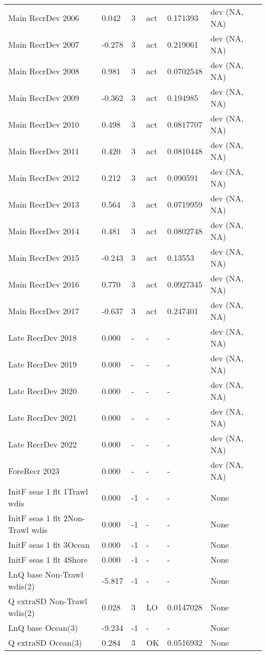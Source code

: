 \documentclass[11pt,
  english,
  letterpaper,
]{article}
\begin{document}
\begin{landscape}
\begin{longtable}[t]{>{\raggedright\arraybackslash}p{6cm}lllll>{\raggedright\arraybackslash}p{4cm}}
Main RecrDev 2006 & 0.042 & 3 & act & 0.171393 & dev (NA, NA)\\
Main RecrDev 2007 & -0.278 & 3 & act & 0.219061 & dev (NA, NA)\\
Main RecrDev 2008 & 0.981 & 3 & act & 0.0702548 & dev (NA, NA)\\
Main RecrDev 2009 & -0.362 & 3 & act & 0.194985 & dev (NA, NA)\\
Main RecrDev 2010 & 0.498 & 3 & act & 0.0817707 & dev (NA, NA)\\
Main RecrDev 2011 & 0.420 & 3 & act & 0.0810448 & dev (NA, NA)\\
Main RecrDev 2012 & 0.212 & 3 & act & 0.090591 & dev (NA, NA)\\
Main RecrDev 2013 & 0.564 & 3 & act & 0.0719959 & dev (NA, NA)\\
Main RecrDev 2014 & 0.481 & 3 & act & 0.0802748 & dev (NA, NA)\\
Main RecrDev 2015 & -0.243 & 3 & act & 0.13553 & dev (NA, NA)\\
Main RecrDev 2016 & 0.770 & 3 & act & 0.0927345 & dev (NA, NA)\\
Main RecrDev 2017 & -0.637 & 3 & act & 0.247401 & dev (NA, NA)\\
Late RecrDev 2018 & 0.000 & - & - & - & dev (NA, NA)\\
Late RecrDev 2019 & 0.000 & - & - & - & dev (NA, NA)\\
Late RecrDev 2020 & 0.000 & - & - & - & dev (NA, NA)\\
Late RecrDev 2021 & 0.000 & - & - & - & dev (NA, NA)\\
Late RecrDev 2022 & 0.000 & - & - & - & dev (NA, NA)\\
ForeRecr 2023 & 0.000 & - & - & - & dev (NA, NA)\\
InitF seas 1 flt 1Trawl wdis & 0.000 & -1 & - & - & None\\
InitF seas 1 flt 2Non-Trawl wdis & 0.000 & -1 & - & - & None\\
InitF seas 1 flt 3Ocean & 0.000 & -1 & - & - & None\\
InitF seas 1 flt 4Shore & 0.000 & -1 & - & - & None\\
LnQ base Non-Trawl wdis(2) & -5.817 & -1 & - & - & None\\
Q extraSD Non-Trawl wdis(2) & 0.028 & 3 & LO & 0.0147028 & None\\
LnQ base Ocean(3) & -9.234 & -1 & - & - & None\\
Q extraSD Ocean(3) & 0.284 & 3 & OK & 0.0516932 & None\\

\end{longtable}
\end{landscape}
\end{document}

